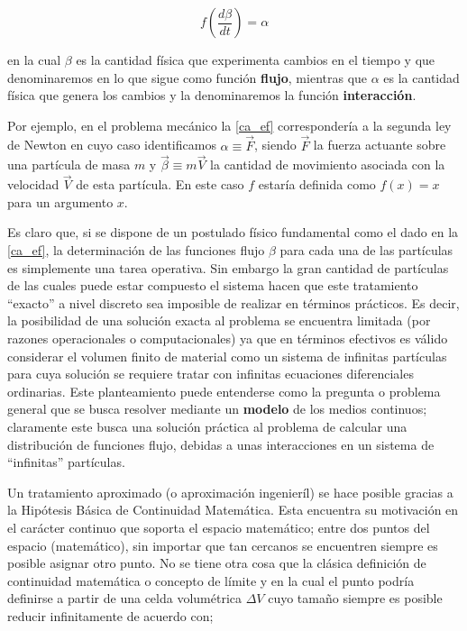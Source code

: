 \documentclass[../notas medios.tex]{subfiles}
\begin{document}
\begin{equation}
f\left(\frac{d\beta}{dt} \right) = \alpha
\label{ca_ef}
\end{equation}

\noindent en la cual $\beta$ es la cantidad física que experimenta cambios en el
tiempo y que denominaremos en lo que sigue como función {\bf flujo}, mientras que $\alpha$ es la cantidad física que genera los cambios y la denominaremos la función {\bf interacción}.

Por ejemplo, en el problema mecánico la \cref{ca_ef} correspondería a la segunda ley de Newton en cuyo caso identificamos $\alpha  \equiv \vec F$, siendo $\vec F$ la fuerza actuante sobre una partícula de masa $m$ y $\vec \beta  \equiv m\vec V$  la cantidad de movimiento asociada con la velocidad $\vec V$ de esta partícula.  En este caso $f$ estaría definida como  $f(x)=x$ para un argumento $x$.

Es claro que, si se dispone de un postulado físico fundamental como el dado en
la \cref{ca_ef}, la determinación de las funciones flujo $\beta$ para cada una de las partículas es simplemente una tarea operativa.  Sin embargo la gran cantidad de partículas de las cuales puede estar compuesto el sistema hacen que este tratamiento ``exacto” a nivel discreto sea imposible de realizar en términos prácticos.  Es decir, la posibilidad de una solución exacta al problema se encuentra limitada (por razones operacionales o computacionales) ya que en términos efectivos es válido considerar el volumen finito de material como un sistema de infinitas partículas para cuya solución se requiere tratar con infinitas ecuaciones diferenciales ordinarias.  Este planteamiento puede entenderse como la pregunta o problema general que se busca resolver mediante un {\bf modelo} de los medios continuos; claramente este busca una solución práctica al problema de calcular una distribución de funciones flujo, debidas a unas interacciones en un sistema de ``infinitas” partículas.

Un tratamiento aproximado (o aproximación ingenieríl) se hace posible gracias a la Hipótesis Básica de Continuidad Matemática.  Esta encuentra su motivación en el carácter continuo que soporta el espacio matemático; entre dos puntos del espacio (matemático), sin importar que tan cercanos se encuentren siempre es posible asignar otro punto.  No se tiene otra cosa que la clásica definición de continuidad matemática o concepto de límite y en la cual el punto podría definirse a partir de una celda volumétrica $\Delta V$ cuyo tamaño siempre es posible reducir infinitamente de acuerdo con;
\end{document}
